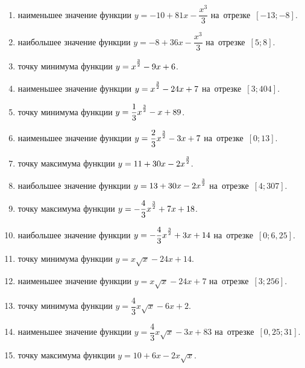 \documentclass[a4paper,10pt]{article}
\begin{document}
\begin{enumerate}
\item {} наименьшее значение функции $y=-10 +81x-\dfrac{x^3}{3}$ на~отрезке~$\left[-13;-8\right]$.

\item {} наибольшее значение функции $y=-8 +36x-\dfrac{x^3}{3}$ на~отрезке~$\left[5;8\right]$.

\item {} точку минимума функции $y=x\strut^{\frac{3}{2}} -9x+6$.

\item {} наименьшее значение функции $y=x\strut^{\frac{3}{2}} -24x+7$ на~отрезке~$\left[3;404\right]$.

\item {} точку минимума функции $y=\dfrac{1}{3}x\strut^{\frac{3}{2}} -x+89$.

\item {} наименьшее значение функции $y=\dfrac{2}{3}x\strut^{\frac{3}{2}} -3x+7$ на~отрезке~$\left[0;13\right]$.

\item {} точку максимума функции $y=11+30x-2x\strut^{\frac{3}{2}}$.

\item {} наибольшее значение функции $y=13+30x-2x\strut^{\frac{3}{2}}$ на~отрезке~$\left[4;307\right]$.

\item {} точку максимума функции $y=-\dfrac{4}{3}x\strut^{\frac{3}{2}} +7x+18$.

\item {} наибольшее значение функции $y=-\dfrac{4}{3}x\strut^{\frac{3}{2}} +3x+14$ на~отрезке~$\left[0;6,25\right]$.

\item {} точку минимума функции $y=x\sqrt{x} -24x+14$.

\item {} наименьшее значение функции $y=x\sqrt{x} -24x+7$ на~отрезке~$\left[3;256\right]$.

\item {} точку минимума функции $y=\dfrac{4}{3}x\sqrt{x} -6x+2$.

\item {} наименьшее значение функции $y=\dfrac{4}{3}x\sqrt{x} -3x+83$ на~отрезке~$\left[0,25;31\right]$.

\item {} точку максимума функции $y=10+6x -2x\sqrt{x}$.


\end{enumerate}
\end{document}
